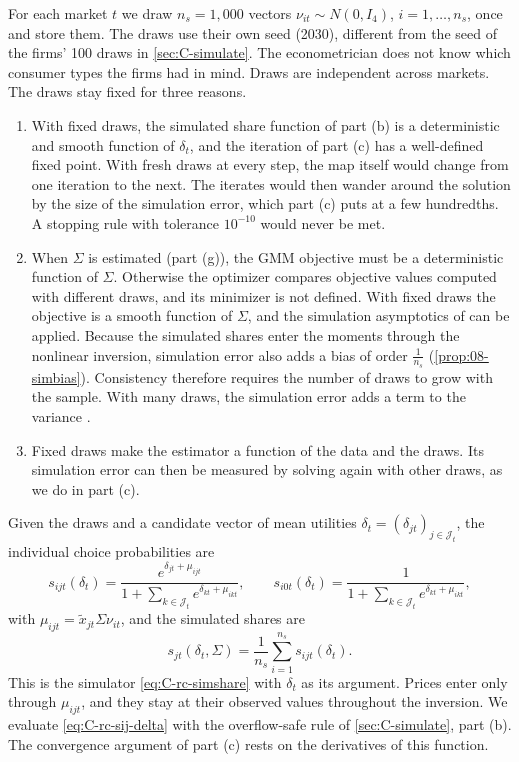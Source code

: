 For each market $t$ we draw $n_s = 1{,}000$ vectors $\nu_{it} \sim N(0, I_4)$, $i = 1, \dots, n_s$, once and store
them. The draws use their own seed (2030), different from the seed of the firms' 100 draws in \cref{sec:C-simulate}.
The econometrician does not know which consumer types the firms had in mind. Draws are independent across
markets. The draws stay fixed for three reasons.
\begin{enumerate}
  \item With fixed draws, the simulated share function of part (b) is a deterministic and smooth function of
  $\delta_t$, and the iteration of part (c) has a well-defined fixed point. With fresh draws at every step, the map
  itself would change from one iteration to the next. The iterates would then wander around the solution by the size
  of the simulation error, which part (c) puts at a few hundredths. A stopping rule with tolerance $10^{-10}$ would
  never be met.
  \item When $\Sigma$ is estimated (part (g)), the GMM objective must be a deterministic function of $\Sigma$.
  Otherwise the optimizer compares objective values computed with different draws, and its minimizer is not defined.
  With fixed draws the objective is a smooth function of $\Sigma$, and the simulation asymptotics of
  \citet{PakesPollard1989} can be applied. Because the simulated shares enter the moments through the nonlinear
  inversion, simulation error also adds a bias of order $\frac{1}{n_s}$ (\cref{prop:08-simbias}). Consistency
  therefore requires the number of draws to grow with the sample. With many draws, the simulation error adds a term
  to the variance \citep{BerryLevinsohnPakes1995}.
  \item Fixed draws make the estimator a function of the data and the draws. Its simulation error can then be measured
  by solving again with other draws, as we do in part (c).
\end{enumerate}

Given the draws and a candidate vector of mean utilities $\delta_t = (\delta_{jt})_{j \in \mathcal{J}_t}$, the
individual choice probabilities are
\begin{equation}\label{eq:C-rc-sij-delta}
  s_{ijt}(\delta_t) = \frac{e^{\delta_{jt} + \mu_{ijt}}}{1 + \sum_{k \in \mathcal{J}_t}e^{\delta_{kt} + \mu_{ikt}}} ,
  \qquad
  s_{i0t}(\delta_t) = \frac{1}{1 + \sum_{k \in \mathcal{J}_t}e^{\delta_{kt} + \mu_{ikt}}} ,
\end{equation}
with $\mu_{ijt} = \tilde x_{jt}\Sigma\nu_{it}$, and the simulated shares are
\begin{equation}\label{eq:C-rc-sdelta}
  s_{jt}(\delta_t, \Sigma) = \frac{1}{n_s}\sum_{i=1}^{n_s}s_{ijt}(\delta_t) .
\end{equation}
This is the simulator \eqref{eq:C-rc-simshare} with $\delta_t$ as its argument. Prices enter only through
$\mu_{ijt}$, and they stay at their observed values throughout the inversion. We evaluate \eqref{eq:C-rc-sij-delta}
with the overflow-safe rule of \cref{sec:C-simulate}, part (b). The convergence argument of part (c) rests on the
derivatives of this function.


